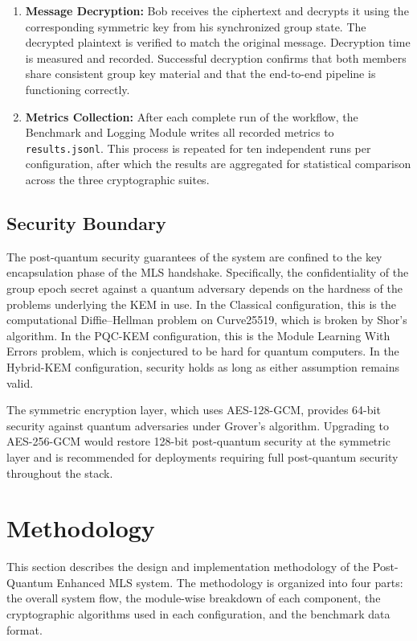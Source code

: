 \documentclass{ieeeaccess}
\begin{document}
\begin{enumerate}
  \item \textbf{Message Decryption:}
  Bob receives the ciphertext and decrypts it using the corresponding symmetric key
  from his synchronized group state. The decrypted plaintext is verified to match
  the original message. Decryption time is measured and recorded. Successful
  decryption confirms that both members share consistent group key material and
  that the end-to-end pipeline is functioning correctly.

  \item \textbf{Metrics Collection:}
  After each complete run of the workflow, the Benchmark and Logging Module
  writes all recorded metrics to \texttt{results.jsonl}. This process is repeated
  for ten independent runs per configuration, after which the results are aggregated
  for statistical comparison across the three cryptographic suites.
\end{enumerate}

\subsection{Security Boundary}

The post-quantum security guarantees of the system are confined to the key
encapsulation phase of the MLS handshake. Specifically, the confidentiality of the
group epoch secret against a quantum adversary depends on the hardness of the
problems underlying the KEM in use. In the Classical configuration, this is the
computational Diffie--Hellman problem on Curve25519, which is broken by Shor's
algorithm. In the PQC-KEM configuration, this is the Module Learning With Errors
problem, which is conjectured to be hard for quantum computers. In the Hybrid-KEM
configuration, security holds as long as either assumption remains valid.

The symmetric encryption layer, which uses AES-128-GCM, provides 64-bit security
against quantum adversaries under Grover's algorithm. Upgrading to AES-256-GCM
would restore 128-bit post-quantum security at the symmetric layer and is recommended
for deployments requiring full post-quantum security throughout the stack.

\section{Methodology}

This section describes the design and implementation methodology of the Post-Quantum Enhanced MLS system. The methodology is organized into four parts: the overall system flow, the module-wise breakdown of each component, the cryptographic algorithms used in each configuration, and the benchmark data format. 
\end{document}
